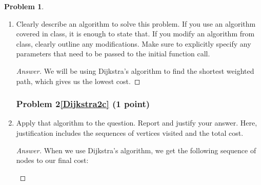 \documentclass[11pt]{article}
\theoremstyle{definition}
\theoremstyle{definition}
\newtheorem{required}{Problem}
\theoremstyle{definition}
\begin{document}
\begin{required}
\begin{enumerate}[label=(\alph*)]
\newpage
\subsubsection{Problem 2\ref{Dijkstra2b} (1 point)}
\item \label{Dijkstra2b} Clearly describe an algorithm to solve this problem. If you use an algorithm covered in class, it is enough to state that. If you modify an algorithm from class, clearly outline any modifications. Make sure to explicitly specify any parameters that need to be passed to the initial function call.

\begin{proof}[Answer]
We will be using Dijkstra's algorithm to find the shortest weighted path, which gives us the lowest cost.
\end{proof}



\newpage
\subsubsection{Problem 2\ref{Dijkstra2c} (1 point)}
\item \label{Dijkstra2c} Apply that algorithm to the question. Report and justify your answer. Here, justification includes the sequences of vertices visited and the total cost. 

\begin{proof}[Answer]
When we use Dijkstra's algorithm, we get the following sequence of nodes to our final cost:\\

\begin{center}
\end{center}
\end{proof}
\end{enumerate}
\end{required}
\end{document}
